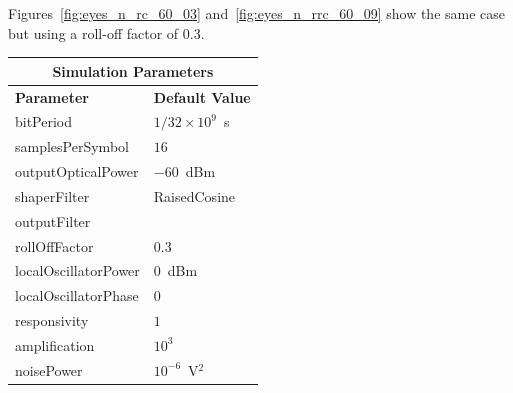 \begin{refsection}
Figures~\ref{fig:eyes_n_rc_60_03} and~\ref{fig:eyes_n_rrc_60_09} show the same
case but using a roll-off factor of 0.3.
\begin{table}[H]
	\centering
	
	\begin{tabular}{|l|l|}
		\hline
		\multicolumn{2}{|c|}{ \textbf{Simulation Parameters} } \\
		\hline
		\textbf{Parameter}     & \textbf{Default Value}                                     \\\hline
		bitPeriod              & $1/32\times10^9$~s														\\\hline
		samplesPerSymbol       & $16$                                                       \\\hline
		outputOpticalPower     & $-60$~dBm 													\\ \hline
		shaperFilter	       & RaisedCosine												\\ \hline
		outputFilter		   &   												\\ \hline
		rollOffFactor		   & 0.3														\\ \hline
		localOscillatorPower   & $0$~dBm                                                    \\ \hline
		localOscillatorPhase   & $0$                                                        \\ \hline
		responsivity           & $1$                                                        \\ \hline
		amplification          & $10^3$                                                     \\ \hline
		noisePower   & $10^{-6}$~V$^2$                             					\\ \hline

\end{tabular}
\end{table}
\end{refsection}

